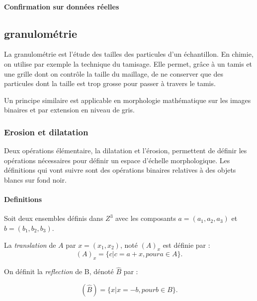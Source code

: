 {\paragraph{Confirmation sur données réelles}


\subsection{granulométrie}
\label{sec:EA:rehaussement:echelle:granulometrie}

La granulométrie est l'étude des tailles des particules d'un échantillon. En chimie, on utilise par exemple la technique du tamisage. Elle permet, grâce à un tamis et une grille dont on contrôle la taille du maillage, de ne conserver que des particules dont la taille est trop grosse pour passer à travers le tamis.

Un principe similaire est applicable en morphologie mathématique sur les images binaires et par extension en niveau de gris.

\subsubsection{Erosion et dilatation }

Deux opérations élémentaire, la dilatation et l'érosion, permettent de définir les opérations nécessaires pour définir un espace d'échelle morphologique. Les définitions qui vont suivre sont des opérations binaires relatives à des objets blancs sur fond noir.

\paragraph{Definitions}
Soit deux ensembles définis dans $Z^3$ avec les composants $a=(a_1,a_2,a_3)$ et $b=(b_1,b_2,b_3)$.

La \emph{translation} de $A$ par $x = (x_1,x_2)$, noté $(A)_x$ est définie par :
\begin{equation}
  (A)_x = \{c|c = a+x, pour a \in A\}. 
\end{equation}

On définit la \emph{reflection} de B, dénoté $\widehat{B}$ par :

\begin{equation}
  (\widehat{B}) = \{x|x = -b, pour b \in B\}. 
\end{equation}

}
